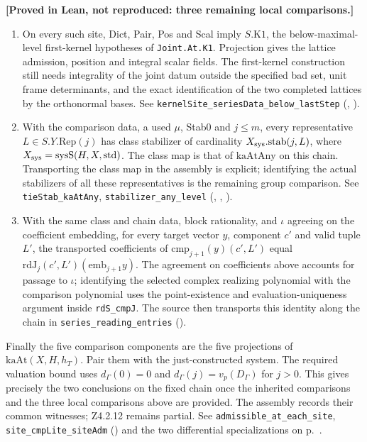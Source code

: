 \textbf{[Proved in Lean, not reproduced: three remaining local
comparisons.]}
\begin{enumerate}
\item On every such site, Dict, Pair, Pos and Scal imply
\(S.\mathrm{K1}\), the below-maximal-level first-kernel hypotheses of
\nolinkurl{Joint.At.K1}. Projection gives the lattice admission,
position and integral scalar fields. The first-kernel construction
still needs integrality of the joint datum outside the specified bad
set, unit frame determinants, and the exact identification of the two
completed lattices by the orthonormal bases.
See \nolinkurl{kernelSite_seriesData_below_lastStep}
(,
).
\item With the comparison data, a used \(\mu\), Stab0 and \(j\le m\),
every representative \(L\in S.Y.\mathrm{Rep}(j)\) has class stabilizer
of cardinality \(X_{\rm sys}.\mathrm{stab}(j,L)\), where
\(X_{\rm sys}=\mathrm{sysS}(H,X,\mathrm{std})\).
The class map is that of \(\mathrm{kaAtAny}\) on this chain.
Transporting the class map in the assembly is explicit; identifying
the actual stabilizers of all these representatives is the remaining
group comparison. See \nolinkurl{tieStab_kaAtAny},
\nolinkurl{stabilizer_any_level}
(,
,
).
\item With the same class and chain data, block rationality, and
\(\iota\) agreeing on the coefficient embedding, for every target
vector \(y\), component \(c'\) and valid tuple \(L'\), the transported
coefficients of \(\mathrm{cmp}_{j+1}(y)(c',L')\) equal
\(\mathrm{rdJ}_j(c',L')(\mathrm{emb}_{j+1} y)\).
The agreement on coefficients above accounts for passage to \(\iota\);
identifying the selected complex realizing polynomial with the
comparison polynomial uses the point-existence and evaluation-uniqueness
argument inside \nolinkurl{rdS_cmpJ}. The source then transports this
identity along the chain in \nolinkurl{series_reading_entries}
().
\end{enumerate}

Finally the five comparison components are the five projections of
\(\mathrm{kaAt}(X,H,h_T)\). Pair them with the just-constructed system.
The required valuation bound uses \(d_\Gamma(0)=0\) and
\(d_\Gamma(j)=v_p(D_\Gamma)\) for \(j>0\). This gives precisely the
two conclusions on the fixed chain once the inherited comparisons
and the three local comparisons above are provided. The assembly
records their common witnesses; Z4.2.12 remains partial. See
\nolinkurl{admissible_at_each_site}, \nolinkurl{site_cmpLite_siteAdm}
()
and the two differential specializations on p.~\pageref{r7:z42-specialize}.

